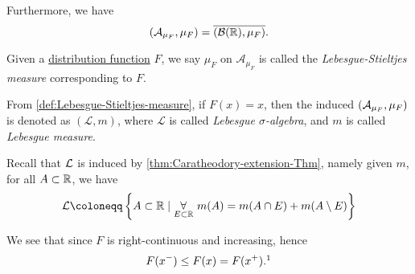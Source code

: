 Furthermore, we have
\[
	(\mathcal{A}_{\mu _F}, \mu _F) = \overline{(\mathcal{B} (\mathbb{\MakeUppercase{r}} ), \mu _F)}.
\]
\begin{definition}\label{def:Lebesgue-Stieltjes-measure}
	Given a \hyperref[def:distribution-function]{distribution function} \(F\), we say \(\mu _F\) on \(\mathcal{A} _{\mu _F}\) is called the
	\emph{Lebesgue-Stieltjes measure} corresponding to \(F\).
\end{definition}

\begin{definition}\label{def:Lebesgue-sigma-algebra}\label{def:Lebesgue-measure}
	From \autoref{def:Lebesgue-Stieltjes-measure}, if \(F(x)=x\), then the induced \((\mathcal{\MakeUppercase{a}} _{\mu _F}, \mu _{F})\) is denoted as \((\mathcal{L} , m)\), where
	\(\mathcal{L} \) is called \emph{Lebesgue \(\sigma\)-algebra}, and \(m\) is called \emph{Lebesgue measure}.
\end{definition}

\begin{remark}
	Recall that \(\mathcal{\MakeUppercase{l}} \) is induced by \autoref{thm:Caratheodory-extension-Thm}, namely given \(m\), for all \(A\subset \mathbb{\MakeUppercase{r}} \),
	we have
	\[
		\mathcal{\MakeUppercase{l}} \coloneqq \left\{A\subset \mathbb{\MakeUppercase{r}} \mid \underset{E\subset \mathbb{\MakeUppercase{r}} }{\forall }\ m(A) = m(A\cap E) + m(A\setminus E)\right\}
	\]
\end{remark}

\begin{note}
	We see that since \(F\) is right-continuous and increasing, hence
	\[
		F(x^-)\leq F(x) = F(x^+).\footnotemark
	\]
\end{note}

